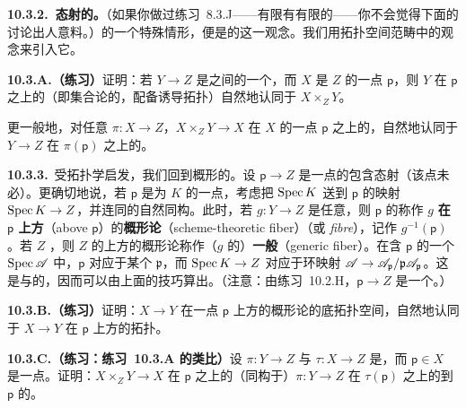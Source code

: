 \textbf{10.3.2.\ 态射的\trFiber。}\quad （如果你做过\mbox{练习~8.3.J}——有限\trMorphism{}有有限的\trFiber——你不会觉得下面的讨论出人意料。）\trPullback{}的一个特殊情形，便是\trMorphism{}的\trFiber{}这一观念。我们用拓扑空间范畴中的\trFiber{}观念来引入它。

\textbf{10.3.A.（练习）}\quad 证明：若 $Y\to Z$ 是\trTopologicalSpace{}之间的一个\trContinuousMap，而 $X$ 是 $Z$ 的一点 $\mathsf{p}$，则 $Y$ 在 $\mathsf{p}$ 之上的\trFiber{}（即集合论的\trFiber，配备诱导拓扑）自然地认同于 $X\times_Z Y$。

更一般地，对任意 $\pi\colon X\to Z$，$X\times_Z Y\to X$ 在 $X$ 的一点 $\mathsf{p}$ 之上的\trFiber，自然地认同于 $Y\to Z$ 在 $\pi(\mathsf{p})$ 之上的\trFiber。

\textbf{10.3.3.}\ \emph{\trhDefinition{}}\quad 受拓扑学启发，我们回到概形的\trCategory。设 $\mathsf{p}\to Z$ 是一点的包含态射（该点未必\trClosed）。更确切地说，若 $\mathsf{p}$ 是\trResidueField{}为 $K$ 的一点，考虑把 $\operatorname{Spec} K$ 送到 $\mathsf{p}$ 的映射 $\operatorname{Spec} K\to Z$，并连同\trResidueField{}的自然同构。此时，若 $g\colon Y\to Z$ 是任意\trMorphism，则 $\mathsf{p}$ 的\trSchemeTheoreticPreimage{}称作 $g$ \textbf{在 $\mathsf{p}$ 上方}（above $\mathsf{p}$）的\textbf{概形论\trFiber}（scheme-theoretic fiber）（或 \emph{fibre}），记作 $g^{-1}(\mathsf{p})$。若 $Z$ \trIrreducible，则 $Z$ 的\trGenericPoint{}上方的概形论\trFiber{}称作（$g$ 的）\textbf{一般\trFiber}（generic fiber）。在含 $\mathsf{p}$ 的一个\trAffine\trOpenSubscheme{} $\operatorname{Spec}\mathscr{A}$ 中，$\mathsf{p}$ 对应于某个\trPrimeIdeal{} $\mathfrak{p}$，而\trMorphism{} $\operatorname{Spec} K\to Z$ 对应于环映射 $\mathscr{A}\to\mathscr{A}_{\mathfrak{p}}/\mathfrak{p}\mathscr{A}_{\mathfrak{p}}$。这是\trLocalization{}与\trClosedEmbedding{}的\trComposition，因而可以由上面的技巧算出。（注意：由\mbox{练习~10.2.H}，$\mathsf{p}\to Z$ 是一个\trMonomorphism。）

\textbf{10.3.B.（练习）}\quad 证明：$X\to Y$ 在一点 $\mathsf{p}$ 上方的概形论\trFiber{}的底拓扑空间，自然地认同于 $X\to Y$ 在 $\mathsf{p}$ 上方的拓扑\trFiber。

\textbf{10.3.C.（练习：练习~10.3.A 的类比）}\quad 设 $\pi\colon Y\to Z$ 与 $\tau\colon X\to Z$ 是\trMorphism，而 $\mathsf{p}\in X$ 是一点。证明：$X\times_Z Y\to X$ 在 $\mathsf{p}$ 之上的\trFiber{}（同构于）$\pi\colon Y\to Z$ 在 $\tau(\mathsf{p})$ 之上的\trFiber{}到 $\mathsf{p}$ 的\trBaseChange。

